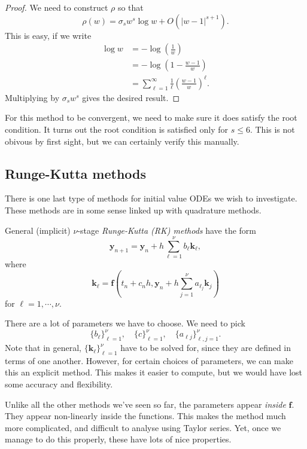\documentclass[a4paper]{article}
\begin{document}
\begin{proof}
  We need to construct $\rho$ so that
  \[
    \rho(w) = \sigma_s w^s \log w + O(|w - 1|^{s + 1}).
  \]
  This is easy, if we write
  \begin{align*}
    \log w &= - \log\left(\frac{1}{w}\right)\\
    &= -\log \left(1 - \frac{w - 1}{w}\right)\\
    &= \sum_{\ell = 1}^\infty \frac{1}{\ell} \left(\frac{w - 1}{w}\right)^\ell.
  \end{align*}
  Multiplying by $\sigma_s w^s$ gives the desired result.
\end{proof}
For this method to be convergent, we need to make sure it does satisfy the root condition. It turns out the root condition is satisfied only for $s \leq 6$. This is not obivous by first sight, but we can certainly verify this manually.

\subsection{Runge-Kutta methods}
There is one last type of methods for initial value ODEs we wish to investigate. These methods are in some sense linked up with quadrature methods.

\begin{defi}
  General (implicit) $\nu$-stage \emph{Runge-Kutta (RK) methods} have the form
  \[
    \mathbf{y}_{n + 1} = \mathbf{y}_n + h \sum_{\ell = 1}^\nu b_\ell \mathbf{k}_\ell,
  \]
  where
  \[
    \mathbf{k}_\ell = \mathbf{f}\left(t_n + c_n h, \mathbf{y}_n + h\sum_{j = 1}^\nu a_{\ell_j} \mathbf{k}_j\right)
  \]
  for $\ell = 1, \cdots, \nu$.
\end{defi}
There are a lot of parameters we have to choose. We need to pick
\[
  \{b_\ell\}_{\ell = 1}^\nu,\quad \{c\}_{\ell = 1}^\nu,\quad \{a_{\ell j}\}_{\ell, j = 1}^\nu.
\]
Note that in general, $\{\mathbf{k}_{\ell}\}_{\ell = 1}^\nu$ have to be solved for, since they are defined in terms of one another. However, for certain choices of parameters, we can make this an explicit method. This makes it easier to compute, but we would have lost some accuracy and flexibility.

Unlike all the other methods we've seen so far, the parameters appear \emph{inside} $\mathbf{f}$. They appear non-linearly inside the functions. This makes the method much more complicated, and difficult to analyse using Taylor series. Yet, once we manage to do this properly, these have lots of nice properties.
\end{document}
